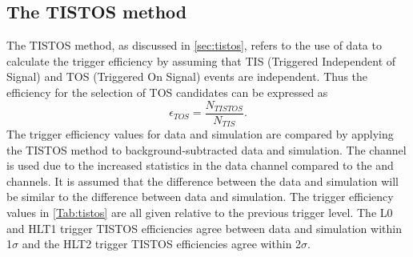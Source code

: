 \subsection{The TISTOS method}
The TISTOS method, as discussed in \autoref{sec:tistos}, refers to the use of data to calculate the trigger efficiency by assuming that TIS (Triggered Independent of Signal) and TOS (Triggered On Signal) events are independent. 
Thus the efficiency for the selection of TOS candidates can be expressed as
\begin{equation}
  \epsilon_{TOS}  = \frac{N_{TISTOS}}{N_{TIS}}.
\end{equation}
The trigger efficiency values for data and simulation  are compared by applying the TISTOS method to background-subtracted \LbKjpsi data and \LbKjpsi simulation. The \LbKjpsi channel is used due to the increased statistics in the \LbKjpsi data channel compared to the \Lbpijpsi and \Lbpi channels.  It is assumed that the difference between the \LbKjpsi data and simulation will be similar to the difference between \Lbpi data and simulation.  The trigger efficiency values in \autoref{Tab:tistos} are all given relative to the previous trigger level. %
The L0 and HLT1 trigger TISTOS efficiencies agree between data and simulation within 1$\sigma$ and the HLT2 trigger TISTOS efficiencies agree within 2$\sigma$.


